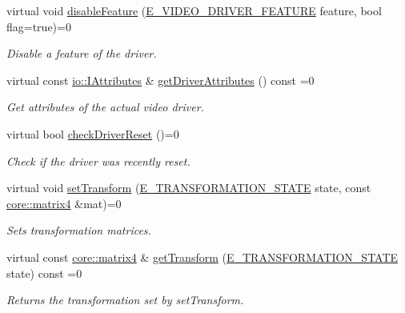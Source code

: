 \begin{DoxyCompactItemize}
virtual void \hyperlink{classirr_1_1video_1_1IVideoDriver_aea64c03fc205f23ec7575884fb7309c8}{disable\+Feature} (\hyperlink{namespaceirr_1_1video_a57b1721e42a79c5dcf8e830e3621e08f}{E\+\_\+\+V\+I\+D\+E\+O\+\_\+\+D\+R\+I\+V\+E\+R\+\_\+\+F\+E\+A\+T\+U\+RE} feature, bool flag=true)=0
\begin{DoxyCompactList}\small\item\em Disable a feature of the driver. \end{DoxyCompactList}\item 
virtual const \hyperlink{classirr_1_1io_1_1IAttributes}{io\+::\+I\+Attributes} \& \hyperlink{classirr_1_1video_1_1IVideoDriver_a2b43d2215f2e5aad9b4f92aa635bcc85}{get\+Driver\+Attributes} () const =0
\begin{DoxyCompactList}\small\item\em Get attributes of the actual video driver. \end{DoxyCompactList}\item 
virtual bool \hyperlink{classirr_1_1video_1_1IVideoDriver_a4ba84ee992939fc913d4935caffce87b}{check\+Driver\+Reset} ()=0
\begin{DoxyCompactList}\small\item\em Check if the driver was recently reset. \end{DoxyCompactList}\item 
virtual void \hyperlink{classirr_1_1video_1_1IVideoDriver_aaf6e88bedf7b91666a2bd34f46e092fc}{set\+Transform} (\hyperlink{namespaceirr_1_1video_a15b57657a320243be03ae6f66fcff43d}{E\+\_\+\+T\+R\+A\+N\+S\+F\+O\+R\+M\+A\+T\+I\+O\+N\+\_\+\+S\+T\+A\+TE} state, const \hyperlink{namespaceirr_1_1core_a4c9d4e29899535971052810954a14431}{core\+::matrix4} \&mat)=0
\begin{DoxyCompactList}\small\item\em Sets transformation matrices. \end{DoxyCompactList}\item 
virtual const \hyperlink{namespaceirr_1_1core_a4c9d4e29899535971052810954a14431}{core\+::matrix4} \& \hyperlink{classirr_1_1video_1_1IVideoDriver_a85c7d04aee02c2d5d8102279f9233101}{get\+Transform} (\hyperlink{namespaceirr_1_1video_a15b57657a320243be03ae6f66fcff43d}{E\+\_\+\+T\+R\+A\+N\+S\+F\+O\+R\+M\+A\+T\+I\+O\+N\+\_\+\+S\+T\+A\+TE} state) const =0
\begin{DoxyCompactList}\small\item\em Returns the transformation set by set\+Transform. \end{DoxyCompactList}\item 

\end{DoxyCompactItemize}
